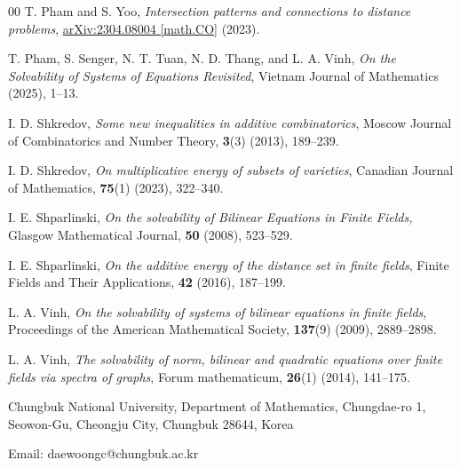 \documentclass[11pt]{article}
\begin{document}
\begin{thebibliography}{00}
T. Pham and S. Yoo, \textit{Intersection patterns and connections to distance problems}, 
\href{https://arxiv.org/abs/2304.08004}
{arXiv:2304.08004 [math.CO]} (2023).

T. Pham, S. Senger, N. T. Tuan, N. D. Thang, and L. A. Vinh, \textit{On the Solvability of Systems of Equations Revisited}, Vietnam Journal of Mathematics (2025), 1--13.



 I. D. Shkredov, \textit{Some new inequalities in additive combinatorics}, Moscow Journal of Combinatorics and Number Theory, \textbf{3}(3) (2013), 189--239.

 I. D. Shkredov, \textit{On multiplicative energy of subsets of varieties}, Canadian Journal of Mathematics,  \textbf{75}(1) (2023), 322--340.

I. E. Shparlinski, \textit{On the solvability of Bilinear Equations in Finite Fields,} Glasgow Mathematical Journal, \textbf{50} (2008), 523–529.

I. E. Shparlinski, \textit{On the additive energy of the distance set in finite fields}, Finite
Fields and Their Applications, \textbf{42} (2016), 187--199.

L. A. Vinh, \textit{On the solvability of systems of bilinear equations in finite fields}, Proceedings of the American Mathematical Society, \textbf{137}(9) (2009), 2889–2898.

L. A. Vinh, \textit{The solvability of norm, bilinear and quadratic equations over finite fields via spectra of graphs}, Forum mathematicum, \textbf{26}(1) (2014), 141–175.



\end{thebibliography}

Chungbuk National University, Department of Mathematics, Chungdae-ro 1, Seowon-Gu, Cheongju City, Chungbuk 28644, Korea

Email: daewoongc@chungbuk.ac.kr

\vspace{0.5 cm}
\end{document}
